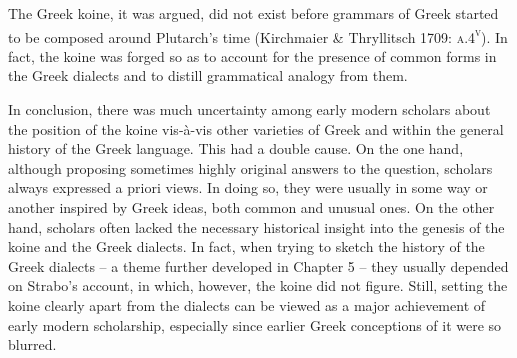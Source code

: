 \documentclass[12pt]{article}
\newenvironment{styleStandard}{\renewcommand\baselinestretch{1.25}\setlength\leftskip{0in}\setlength\rightskip{0in}\setlength\parindent{0.1972in}\setlength\parfillskip{0pt plus 1fil}\setlength\parskip{0in plus 1pt}\writerlistparindent\writerlistleftskip\leavevmode\normalfont\normalsize\writerlistlabel\ignorespaces}{\unskip\vspace{0in plus 1pt}\par}
\newcommand\writerlistleftskip{}
\newcommand\writerlistparindent{}
\newcommand\writerlistlabel{}
\begin{document}
\begin{styleStandard}
The Greek koine, it was argued, did not exist before grammars of Greek started to be composed around Plutarch’s time (Kirchmaier \& Thryllitsch 1709: \textsc{a.4}\textsc{\textsuperscript{v}}). In fact, the koine was forged so as to account for the presence of common forms in the Greek dialects and to distill grammatical analogy from them.
\end{styleStandard}

\begin{styleStandard}
In conclusion, there was much uncertainty among early modern scholars about the position of the koine vis-à-vis other varieties of Greek and within the general history of the Greek language. This had a double cause. On the one hand, although proposing sometimes highly original answers to the question, scholars always expressed a priori views. In doing so, they were usually in some way or another inspired by Greek ideas, both common and unusual ones. On the other hand, scholars often lacked the necessary historical insight into the genesis of the koine and the Greek dialects. In fact, when trying to sketch the history of the Greek dialects – a theme further developed in Chapter 5 – they usually depended on Strabo’s account, in which, however, the koine did not figure. Still, setting the koine clearly apart from the dialects can be viewed as a major achievement of early modern scholarship, especially since earlier Greek conceptions of it were so blurred.
\end{styleStandard}
\end{document}
